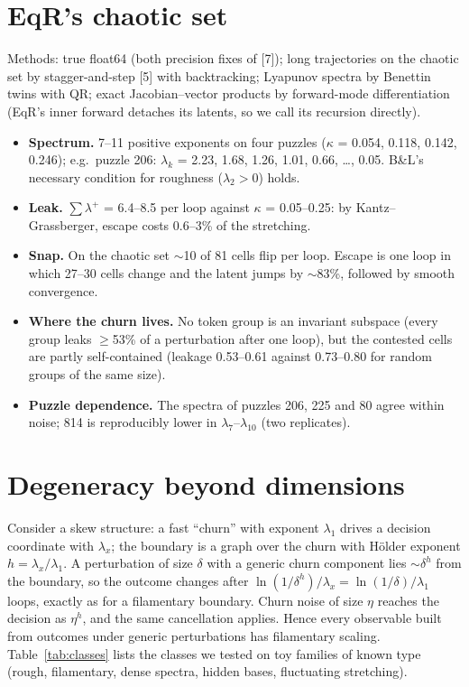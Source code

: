 \documentclass[10pt,twocolumn]{article}
\begin{document}
\section{EqR's chaotic set}
Methods: true float64 (both precision fixes of [7]); long trajectories on the chaotic set by stagger-and-step [5] with
backtracking; Lyapunov spectra by Benettin twins with QR; exact Jacobian--vector products by forward-mode
differentiation (EqR's inner forward detaches its latents, so we call its recursion directly).
\begin{itemize}\setlength{\itemsep}{0pt}
\item \textbf{Spectrum.} 7--11 positive exponents on four puzzles ($\kappa$ = 0.054, 0.118, 0.142, 0.246); e.g.\ puzzle 206:
$\lambda_k$ = 2.23, 1.68, 1.26, 1.01, 0.66, \ldots, 0.05. B\&L's necessary condition for roughness ($\lambda_2>0$) holds.
\item \textbf{Leak.} $\sum\lambda^+$ = 6.4--8.5 per loop against $\kappa$ = 0.05--0.25: by Kantz--Grassberger, escape costs
0.6--3\% of the stretching.
\item \textbf{Snap.} On the chaotic set $\sim$10 of 81 cells flip per loop. Escape is one loop in which 27--30 cells
change and the latent jumps by $\sim$83\%, followed by smooth convergence.
\item \textbf{Where the churn lives.} No token group is an invariant subspace (every group leaks $\geq$53\% of a
perturbation after one loop), but the contested cells are partly self-contained (leakage 0.53--0.61 against 0.73--0.80
for random groups of the same size).
\item \textbf{Puzzle dependence.} The spectra of puzzles 206, 225 and 80 agree within noise; 814 is reproducibly lower in
$\lambda_7$--$\lambda_{10}$ (two replicates).
\end{itemize}

\section{Degeneracy beyond dimensions}
Consider a skew structure: a fast ``churn'' with exponent $\lambda_1$ drives a decision coordinate with $\lambda_x$; the
boundary is a graph over the churn with H\"older exponent $h=\lambda_x/\lambda_1$. A perturbation of size $\delta$ with
a generic churn component lies $\sim\delta^{h}$ from the boundary, so the outcome changes after
$\ln(1/\delta^{h})/\lambda_x=\ln(1/\delta)/\lambda_1$ loops, exactly as for a filamentary boundary. Churn noise of size
$\eta$ reaches the decision as $\eta^{h}$, and the same cancellation applies. Hence every observable built from
outcomes under generic perturbations has filamentary scaling. Table~\ref{tab:classes} lists the classes we tested on
toy families of known type (rough, filamentary, dense spectra, hidden bases, fluctuating stretching).
\end{document}

